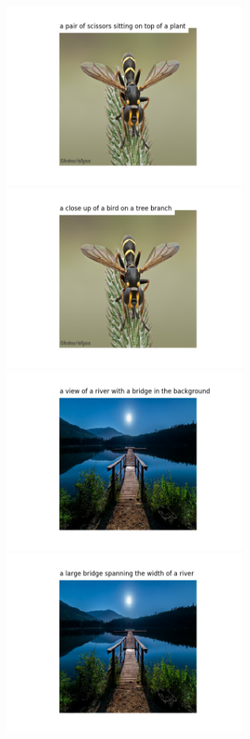 \documentclass{article}
\begin{document}
\hspace*{-1cm}\includegraphics[width=80mm]{images/Figure_55.png}
\hspace*{-1cm}\includegraphics[width=80mm]{images/MFigure_55.png}
\hspace*{-1cm}\includegraphics[width=80mm]{images/Figure_66.png}
\hspace*{-1cm}\includegraphics[width=80mm]{images/MFigure_66.png}
\end{document}
